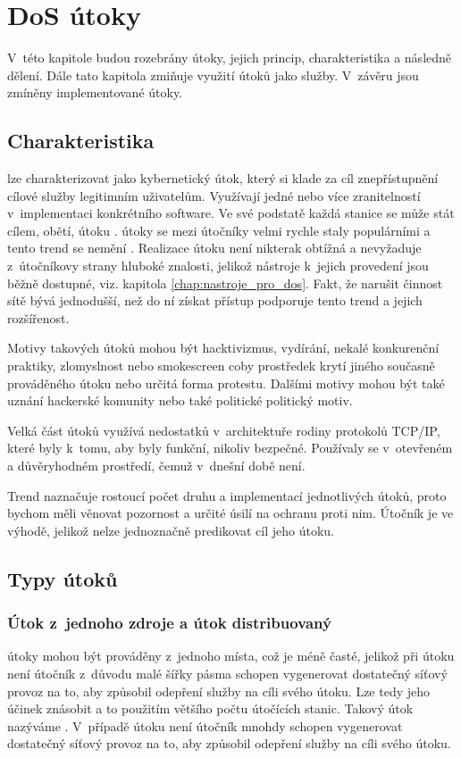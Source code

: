 \chapter[DoS útoky]{DoS útoky}
V~této kapitole budou rozebrány  útoky, jejich princip, charakteristika a následně
dělení. Dále tato kapitola zmiňuje využití  útoků jako služby. V~závěru jsou
zmíněny implementované útoky.

\section{Charakteristika}
 lze charakterizovat jako kybernetický útok, který si klade za cíl znepřístupnění
 cílové služby legitimním uživatelům. Využívají jedné nebo více zranitelností v~implementaci
 konkrétního software. Ve své podstatě každá stanice se může stát cílem, obětí, útoku
 .  útoky se mezi útočníky velmi rychle staly populárními a tento trend
 se nemění \cite{akamai_q2_2017}. Realizace  útoku není nikterak obtížná a
 nevyžaduje z~útočníkovy strany hluboké znalosti, jelikož nástroje k~jejich provedení jsou
 běžně dostupné, viz. kapitola \ref{chap:nastroje_pro_dos}. Fakt, že narušit činnost sítě bývá
 jednodušší, než do ní získat přístup podporuje tento trend a jejich rozšířenost. 

Motivy takových útoků mohou být hacktivizmus, vydírání, nekalé konkurenční praktiky,
zlomyslnost nebo smokescreen coby prostředek krytí jiného současně prováděného útoku nebo
určitá forma protestu. Dalšími motivy mohou být také uznání hackerské komunity nebo také
politické politický motiv.

Velká část útoků využívá nedostatků v~architektuře rodiny protokolů TCP/IP, které byly k~tomu,
aby byly funkční, nikoliv bezpečné. Používaly se v~otevřeném a důvěryhodném prostředí, čemuž
v~dnešní době není.

Trend naznačuje rostoucí počet druhu a implementací jednotlivých útoků, proto bychom měli
věnovat pozornost a určité úsilí na ochranu proti nim. Útočník je ve výhodě, jelikož nelze
jednoznačně predikovat cíl jeho útoku.


\section{Typy útoků}
\subsection{Útok z~jednoho zdroje a útok distribuovaný}
 útoky mohou být prováděny z~jednoho místa, což je méně časté, jelikož při
 útoku není útočník z~důvodu malé šířky pásma schopen vygenerovat dostatečný síťový
provoz na to, aby způsobil odepření služby na cíli svého útoku. Lze tedy jeho účinek znásobit a
to použitím většího počtu útočících stanic. Takový útok nazýváme . V~případě
 útoku není útočník mnohdy schopen vygenerovat dostatečný síťový provoz na to, aby
způsobil odepření služby na cíli svého útoku.

